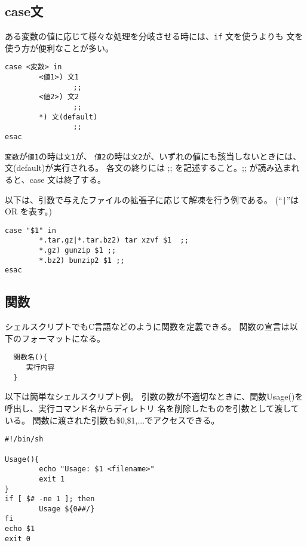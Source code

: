\documentclass{jreport}
\begin{document}
\subsection{case文}

ある変数の値に応じて様々な処理を分岐させる時には、\verb|if| 文を使うよりも
 文を使う方が便利なことが多い。
\begin{screen}
\begin{verbatim}
case <変数> in
        <値1>) 文1
                ;;
        <値2>) 文2
                ;;
        *) 文(default)
                ;;
esac
\end{verbatim}
\end{screen}
\verb|変数|が\verb|値1|の時は\verb|文1|が、
\verb|値2|の時は\verb|文2|が、いずれの値にも該当しないときには、
文(default)が実行される。
各文の終りには ;; を記述すること。;; が読み込まれると、case 文は終了する。

以下は、引数で与えたファイルの拡張子に応じて解凍を行う例である。
(``\verb+|+''は OR を表す。)
\begin{screen}
\begin{verbatim}
case "$1" in
        *.tar.gz|*.tar.bz2) tar xzvf $1  ;;
        *.gz) gunzip $1 ;;
        *.bz2) bunzip2 $1 ;;
esac
\end{verbatim}
\end{screen}

\subsection{関数}

シェルスクリプトでもC言語などのように関数を定義できる。
関数の宣言は以下のフォーマットになる。
\begin{screen}
\begin{verbatim}
  関数名(){
     実行内容
  }
\end{verbatim}
\end{screen}
以下は簡単なシェルスクリプト例。
引数の数が不適切なときに、関数Usage()を呼出し、実行コマンド名からディレトリ
名を削除したものを引数として渡している。
関数に渡された引数も\$0,\$1,...でアクセスできる。
\begin{screen}
\begin{verbatim}
#!/bin/sh

Usage(){
        echo "Usage: $1 <filename>"
        exit 1
}
if [ $# -ne 1 ]; then
        Usage ${0##/}
fi
echo $1
exit 0
\end{verbatim}
\end{screen}
\end{document}
